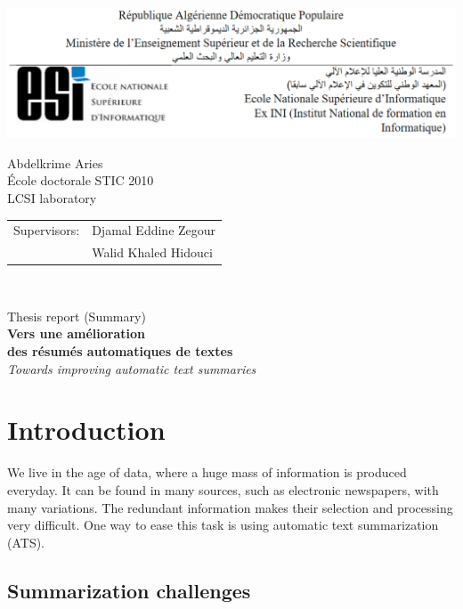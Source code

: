 \documentclass[12pt, oneside, a4paper]{article}
\begin{document}

\noindent
\includegraphics[width=\textwidth]{figures/logo/esi-header.png}

\noindent
Abdelkrime Aries  \\
\'Ecole doctorale STIC 2010 \\
LCSI laboratory\\
\noindent
\begin{tabular}{@{}ll}
Supervisors: & Djamal Eddine Zegour \\
& Walid Khaled Hidouci\\
\end{tabular}\\[.5 cm]

\noindent
\begin{center}
	Thesis report (Summary)\\
{\LARGE \textbf{Vers une amélioration \\des résumés automatiques de textes}}\\[.5 cm]
{\large\itshape Towards improving automatic text summaries}\\[1 cm]
\end{center}

\section{Introduction}

We live in the age of data, where a huge mass of information is produced everyday. 
It can be found in many sources, such as electronic newspapers, with many variations.
The redundant information makes their selection and processing very difficult.
One way to ease this task is using automatic text summarization (ATS).

\subsection{Summarization challenges}
\end{document}

